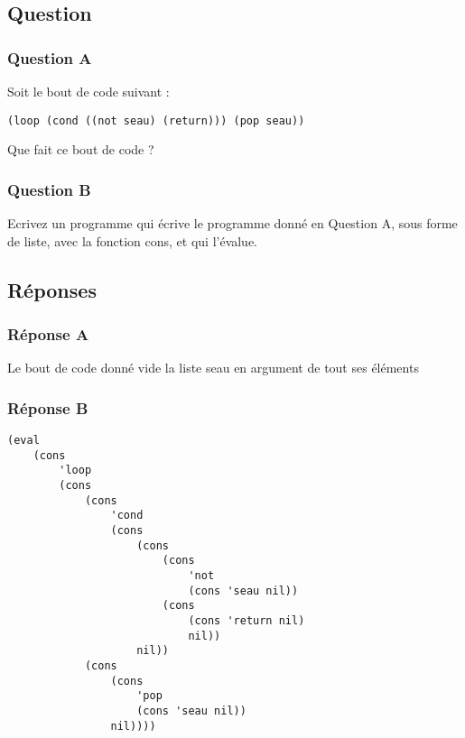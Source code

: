 \documentclass[a4paper, 11pt]{article}
\begin{document}
\subsection{Question}
\subsubsection{Question A}
Soit le bout de code suivant :
\begin{lstlisting}
(loop (cond ((not seau) (return))) (pop seau))
\end{lstlisting}
Que fait ce bout de code ?
\subsubsection{Question B}
Ecrivez un programme qui écrive le programme donné en Question A, sous forme de liste, avec la fonction cons, et qui l'évalue.
\subsection{Réponses}
\subsubsection{Réponse A}
Le bout de code donné vide la liste seau en argument de tout ses éléments
\subsubsection{Réponse B}
\begin{lstlisting}
(eval
    (cons
        'loop
        (cons
            (cons
                'cond
                (cons
                    (cons
                        (cons
                            'not
                            (cons 'seau nil))
                        (cons
                            (cons 'return nil)
                            nil))
                    nil))
            (cons
                (cons
                    'pop
                    (cons 'seau nil))
                nil))))
\end{lstlisting}
%
\end{document}

